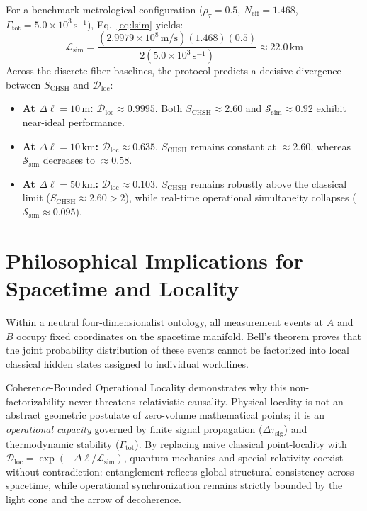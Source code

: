 \documentclass[11pt,a4paper]{article}
\begin{document}
For a benchmark metrological configuration ($\rho_\tau = 0.5$, $N_{\mathrm{eff}} = 1.468$, $\Gamma_{\mathrm{tot}} = 5.0 \times 10^3\,\mathrm{s}^{-1}$), Eq.~\eqref{eq:lsim} yields:
\begin{equation}
    \mathcal{L}_{\mathrm{sim}} = \frac{(2.9979 \times 10^8\,\mathrm{m/s})(1.468)(0.5)}{2(5.0 \times 10^3\,\mathrm{s}^{-1})} \approx 22.0\,\mathrm{km}
\end{equation}
Across the discrete fiber baselines, the protocol predicts a decisive divergence between $S_{\mathrm{CHSH}}$ and $\mathcal{D}_{\mathrm{loc}}$:
\begin{itemize}
    \item \textbf{At $\Delta\ell = 10\,\mathrm{m}$:} $\mathcal{D}_{\mathrm{loc}} \approx 0.9995$. Both $S_{\mathrm{CHSH}} \approx 2.60$ and $\mathcal{S}_{\mathrm{sim}} \approx 0.92$ exhibit near-ideal performance.
    \item \textbf{At $\Delta\ell = 10\,\mathrm{km}$:} $\mathcal{D}_{\mathrm{loc}} \approx 0.635$. $S_{\mathrm{CHSH}}$ remains constant at $\approx 2.60$, whereas $\mathcal{S}_{\mathrm{sim}}$ decreases to $\approx 0.58$.
    \item \textbf{At $\Delta\ell = 50\,\mathrm{km}$:} $\mathcal{D}_{\mathrm{loc}} \approx 0.103$. $S_{\mathrm{CHSH}}$ remains robustly above the classical limit ($S_{\mathrm{CHSH}} \approx 2.60 > 2$), while real-time operational simultaneity collapses ($\mathcal{S}_{\mathrm{sim}} \approx 0.095$).
\end{itemize}

\section{Philosophical Implications for Spacetime and Locality}

Within a neutral four-dimensionalist ontology, all measurement events at $A$ and $B$ occupy fixed coordinates on the spacetime manifold. Bell's theorem proves that the joint probability distribution of these events cannot be factorized into local classical hidden states assigned to individual worldlines.

Coherence-Bounded Operational Locality demonstrates why this non-factorizability never threatens relativistic causality. Physical locality is not an abstract geometric postulate of zero-volume mathematical points; it is an \emph{operational capacity} governed by finite signal propagation ($\Delta\tau_{\mathrm{sig}}$) and thermodynamic stability ($\Gamma_{\mathrm{tot}}$). By replacing naive classical point-locality with $\mathcal{D}_{\mathrm{loc}} = \exp(-\Delta\ell / \mathcal{L}_{\mathrm{sim}})$, quantum mechanics and special relativity coexist without contradiction: entanglement reflects global structural consistency across spacetime, while operational synchronization remains strictly bounded by the light cone and the arrow of decoherence.
\end{document}
